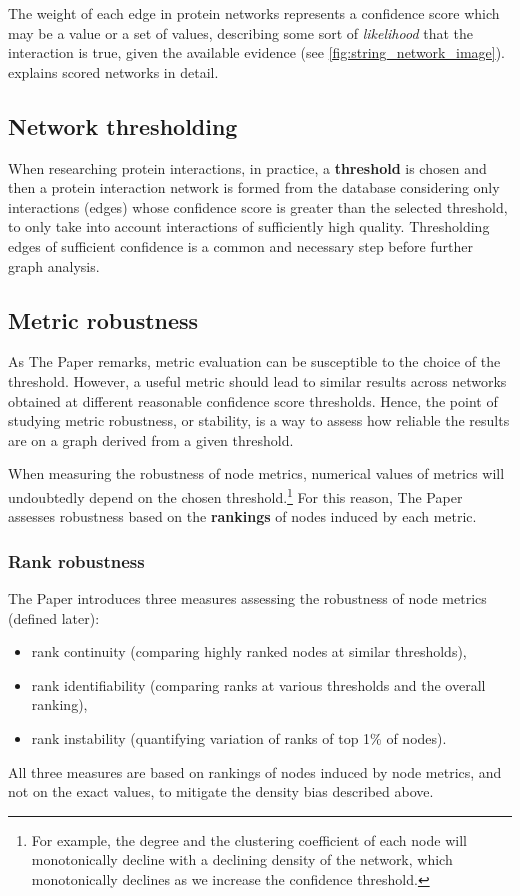 


The weight of each edge in protein networks represents a confidence score which may be a value or a set of values, describing some sort of \textsl{likelihood} that the interaction is true, given the available evidence (see \cref{fig:string_network_image}).
 explains scored networks in detail.

\subsection{Network thresholding}

When researching protein interactions, in practice, a \textbf{threshold} is chosen and then a protein interaction network is formed from the database considering only interactions (edges) whose confidence score is greater than the selected threshold, to only take into account interactions of sufficiently high quality.
Thresholding edges of sufficient confidence is a common and necessary step before further graph analysis.

\subsection{Metric robustness}

As The Paper remarks, metric evaluation can be susceptible to the choice of the threshold.
However, a useful metric should lead to similar results across networks obtained at different reasonable confidence score thresholds.
Hence, the point of studying metric robustness, or stability, is a way to assess how reliable the results are on a graph derived from a given threshold.

When measuring the robustness of node metrics, numerical values of metrics will undoubtedly depend on the chosen threshold.\footnote{For example, the degree and the clustering coefficient of each node will monotonically decline with a declining density of the network, which monotonically declines as we increase the confidence threshold.}
For this reason, The Paper assesses robustness based on the \textbf{rankings} of nodes induced by each metric.

\subsubsection*{Rank robustness}

The Paper introduces three measures assessing the robustness of node metrics (defined later):
\begin{itemize}[topsep=5pt]
    \item rank continuity (comparing highly ranked nodes at similar thresholds),
    \item rank identifiability (comparing ranks at various thresholds and the overall ranking),
    \item rank instability (quantifying variation of ranks of top 1\% of nodes).
\end{itemize}
All three measures are based on rankings of nodes induced by node metrics, and not on the exact values, to mitigate the density bias described above.

